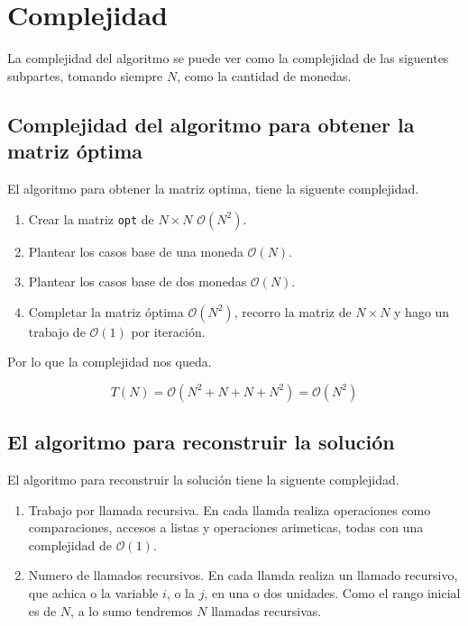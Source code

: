 \section{Complejidad}

La complejidad del algoritmo se puede ver como la complejidad de las siguentes subpartes, tomando siempre $N$, como la cantidad de monedas.

\subsection{Complejidad del algoritmo para obtener la matriz óptima}

El algoritmo para obtener la matriz optima, tiene la siguente complejidad.

\begin{enumerate}
    \item Crear la matriz \texttt{opt} de $N \times N$ $\mathcal{O}(N^2)$.
    \item Plantear los casos base de una moneda $\mathcal{O}(N)$.
    \item Plantear los casos base de dos monedas $\mathcal{O}(N)$.
    \item Completar la matriz óptima $\mathcal{O}(N^2)$, recorro la matriz de $N \times N$ y hago un trabajo de $\mathcal{O}(1)$ por iteración.
\end{enumerate}

Por lo que la complejidad nos queda.

\[
T(N) = \mathcal{O}(N^2 + N + N + N^2) = \mathcal{O}(N^2)
\]

\subsection{El algoritmo para reconstruir la solución}

El algoritmo para reconstruir la solución tiene la siguente complejidad.

\begin{enumerate}
    \item Trabajo por llamada recursiva. En cada llamda realiza operaciones como comparaciones, accesos a listas y operaciones arimeticas, todas con una complejidad de $\mathcal{O}(1)$.
    \item Numero de llamados recursivos. En cada llamda realiza un llamado recursivo, que achica o la variable $i$, o la $j$, en una o dos unidades. Como el rango inicial es de $N$, a lo sumo tendremos $N$ llamadas recursivas.
\end{enumerate}

